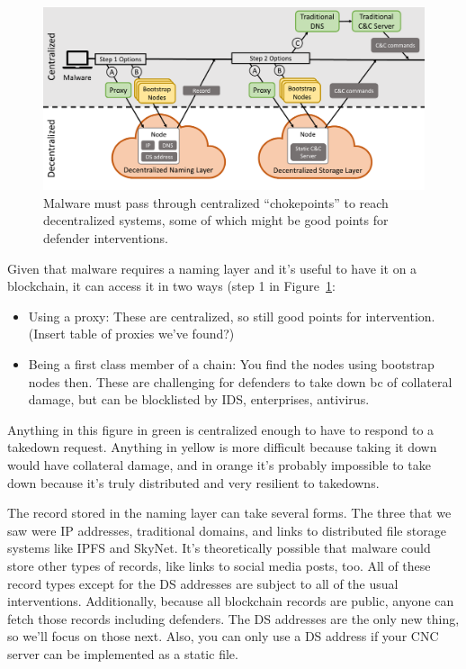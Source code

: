 \documentclass[10pt,sigconf,letterpaper]{acmart}
\begin{document}
\begin{figure}[t]
	\centering
	\includegraphics[width=\textwidth]{figs/malware_contacting_cnc.pdf}
	\caption{Malware must pass through centralized ``chokepoints'' to reach 
		decentralized systems, some of which might be good points for defender 
		interventions.}
	\label{fig:malware_contacting_cnc}
\end{figure}

Given that malware requires a naming layer and it’s useful to have it on a 
blockchain, it can access it in two ways (step 1 in 
Figure~\ref{fig:malware_contacting_cnc}:
\begin{itemize}
	\item Using a proxy: These are centralized, so still good points for 
	intervention. (Insert table of proxies we've found?)
	\item Being a first class member of a chain: You find the nodes using 
	bootstrap nodes then. These are challenging for defenders to take down bc 
	of collateral damage, but can be blocklisted by IDS, 
	enterprises, antivirus. 
\end{itemize}

Anything in this figure in green is centralized enough to 
have to respond to a takedown request. Anything in yellow is 
more difficult because taking it down would have collateral 
damage, and in orange it's probably impossible to take down 
because it's truly distributed and very resilient to 
takedowns.

The record stored in the naming layer can take 
several forms. The three that we saw were IP addresses, 
traditional domains, and links to distributed file storage 
systems like IPFS and SkyNet. It's theoretically possible 
that malware could store other types of records, like links 
to social media posts, too. All of these record types except 
for the DS addresses are subject to all of the usual 
interventions. Additionally, because all blockchain records 
are public, anyone can fetch those records including 
defenders. The DS addresses are the only new thing, so we'll 
focus on those next. Also, you can only use a DS address if 
your CNC server can be implemented as a static file.
\end{document}
